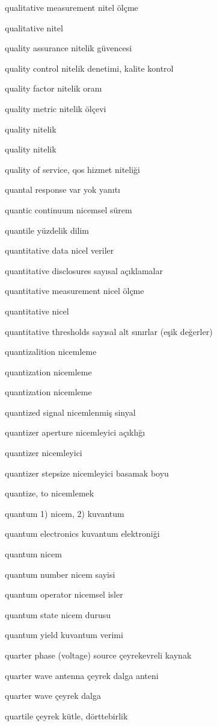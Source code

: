 \documentclass[12pt,fleqn]{article}\usepackage{../../common}
\begin{document}
qualitative measurement nitel ölçme

qualitative nitel

quality assurance nitelik güvencesi

quality control nitelik denetimi, kalite kontrol

quality factor nitelik oranı

quality metric nitelik ölçevi

quality nitelik

quality nitelik

quality of service, qos hizmet niteliği

quantal response var yok yanıtı

quantic continuum nicemsel sürem

quantile yüzdelik dilim

quantitative data nicel veriler

quantitative disclosures sayısal açıklamalar

quantitative measurement nicel ölçme

quantitative nicel

quantitative thresholds sayısal alt sınırlar (eşik değerler)

quantizalition nicemleme

quantization nicemleme

quantization nicemleme

quantized signal nicemlenmiş sinyal

quantizer aperture nicemleyici açıklığı

quantizer nicemleyici

quantizer stepsize nicemleyici basamak boyu

quantize, to nicemlemek

quantum 1) nicem, 2) kuvantum

quantum electronics kuvantum elektroniği

quantum nicem

quantum number nicem sayisi

quantum operator nicemsel isler

quantum state nicem durusu

quantum yield kuvantum verimi

quarter phase (voltage) source çeyrekevreli kaynak

quarter wave antenna çeyrek dalga anteni

quarter wave çeyrek dalga

quartile çeyrek kütle, dörttebirlik
\end{document}
